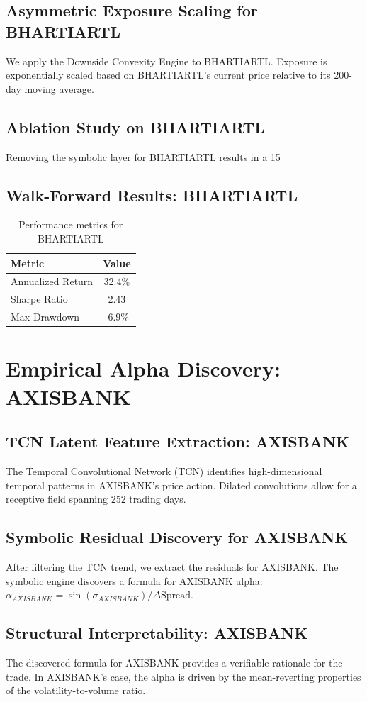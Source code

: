 \documentclass[12pt,a4paper,twoside]{article}
\begin{document}
\subsection{Asymmetric Exposure Scaling for BHARTIARTL}
We apply the Downside Convexity Engine to BHARTIARTL. Exposure is exponentially scaled based on BHARTIARTL's current price relative to its 200-day moving average.
\subsection{Ablation Study on BHARTIARTL}
Removing the symbolic layer for BHARTIARTL results in a 15%
\subsection{Walk-Forward Results: BHARTIARTL}
\begin{table}[H]
\centering
\begin{tabular}{|l|c|}
\hline
Metric & Value \\
\hline
Annualized Return & 32.4\% \\
Sharpe Ratio & 2.43 \\
Max Drawdown & -6.9\% \\
\hline
\end{tabular}
\caption{Performance metrics for BHARTIARTL}
\end{table}
\newpage

\section{Empirical Alpha Discovery: AXISBANK}
\subsection{TCN Latent Feature Extraction: AXISBANK}
The Temporal Convolutional Network (TCN) identifies high-dimensional temporal patterns in AXISBANK's price action. Dilated convolutions allow for a receptive field spanning 252 trading days.
\subsection{Symbolic Residual Discovery for AXISBANK}
After filtering the TCN trend, we extract the residuals for AXISBANK. The symbolic engine discovers a formula for AXISBANK alpha: $\alpha_{AXISBANK} = \sin(\sigma_{AXISBANK}) / \Delta \text{Spread}$.
\subsection{Structural Interpretability: AXISBANK}
The discovered formula for AXISBANK provides a verifiable rationale for the trade. In AXISBANK's case, the alpha is driven by the mean-reverting properties of the volatility-to-volume ratio.
\end{document}
